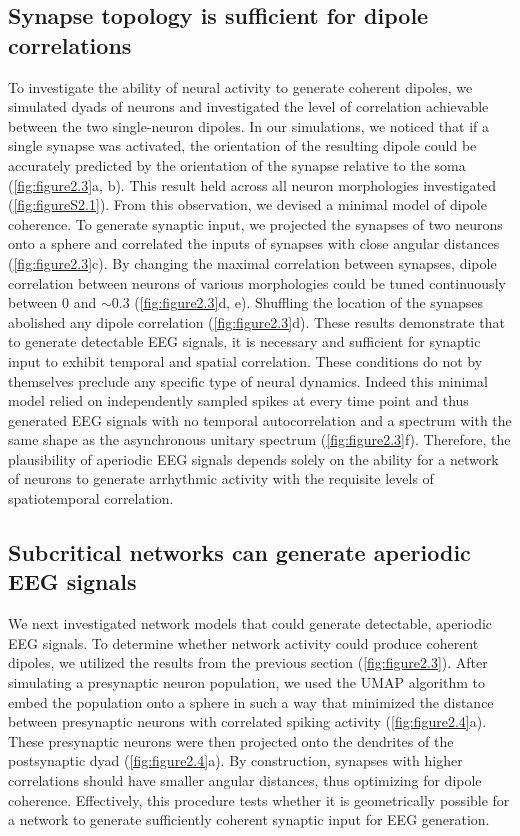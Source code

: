 \subsection{Synapse topology is sufficient for dipole correlations}
To investigate the ability of neural activity to generate coherent dipoles, we simulated dyads of neurons and investigated the level of correlation achievable between the two single-neuron dipoles. In our simulations, we noticed that if a single synapse was activated, the orientation of the resulting dipole could be accurately predicted by the orientation of the synapse relative to the soma (\autoref{fig:figure2.3}a, b). This result held across all neuron morphologies investigated (\autoref{fig:figureS2.1}). From this observation, we devised a minimal model of dipole coherence. To generate synaptic input, we projected the synapses of two neurons onto a sphere and correlated the inputs of synapses with close angular distances (\autoref{fig:figure2.3}c). By changing the maximal correlation between synapses, dipole correlation between neurons of various morphologies could be tuned continuously between 0 and ${\sim}0.3$ (\autoref{fig:figure2.3}d, e). Shuffling the location of the synapses abolished any dipole correlation (\autoref{fig:figure2.3}d). These results demonstrate that to generate detectable EEG signals, it is necessary and sufficient for synaptic input to exhibit temporal and spatial correlation. These conditions do not by themselves preclude any specific type of neural dynamics. Indeed this minimal model relied on independently sampled spikes at every time point and thus generated EEG signals with no temporal autocorrelation and a spectrum with the same shape as the asynchronous unitary spectrum (\autoref{fig:figure2.3}f). Therefore, the plausibility of aperiodic EEG signals depends solely on the ability for a network of neurons to generate arrhythmic activity with the requisite levels of spatiotemporal correlation. 

\subsection{Subcritical networks can generate aperiodic EEG signals}
We next investigated network models that could generate detectable, aperiodic EEG signals. To determine whether network activity could produce coherent dipoles, we utilized the results from the previous section (\autoref{fig:figure2.3}). After simulating a presynaptic neuron population, we used the UMAP algorithm\cite{McInnes2018} to embed the population onto a sphere in such a way that minimized the distance between presynaptic neurons with correlated spiking activity (\autoref{fig:figure2.4}a). These presynaptic neurons were then projected onto the dendrites of the postsynaptic dyad (\autoref{fig:figure2.4}a). By construction, synapses with higher correlations should have smaller angular distances, thus optimizing for dipole coherence. Effectively, this procedure tests whether it is geometrically possible for a network to generate sufficiently coherent synaptic input for EEG generation. 


